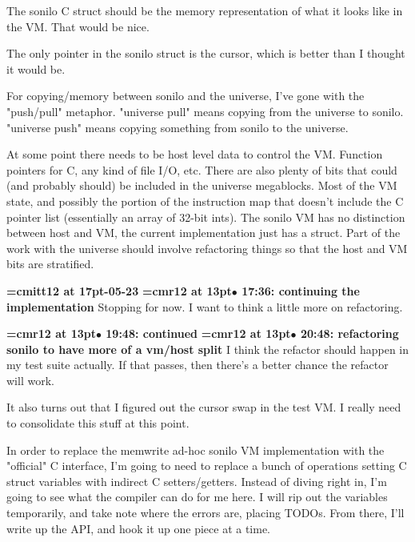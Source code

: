 The sonilo C struct should be the memory representation of what it looks like in the VM. That would be nice.
\par

The only pointer in the sonilo struct is the cursor, which is better than I thought it would be.
\par

For copying/memory between sonilo and the universe, I've gone with the "push/pull" metaphor. "universe pull" means copying from the universe to sonilo. "universe push" means copying something from sonilo to the universe.
\par

At some point there needs to be host level data to control the VM. Function pointers for C, any kind of file I/O, etc. There are also plenty of bits that could (and probably should) be included in the universe megablocks. Most of the VM state, and possibly the portion of the instruction map that doesn't include the C pointer list (essentially an array of 32-bit ints). The sonilo VM has no distinction between host and VM, the current implementation just has a struct. Part of the work with the universe should involve refactoring things so that the host and VM bits are stratified.
\par

{\medskip\noindent\bf\font\titlefont=cmitt12 at 17pt-05-23}\medskip
{\smallskip\noindent\bf\font\titlefont=cmr12 at 13pt\titlefont $\bullet$ 17:36: continuing the implementation}\smallskip
Stopping for now. I want to think a little more on refactoring.
\par

{\smallskip\noindent\bf\font\titlefont=cmr12 at 13pt\titlefont $\bullet$ 19:48: continued}\smallskip
{\smallskip\noindent\bf\font\titlefont=cmr12 at 13pt\titlefont $\bullet$ 20:48: refactoring sonilo to have more of a vm/host split}\smallskip
I think the refactor should happen in my test suite actually. If that passes, then there's a better chance the refactor will work.
\par

It also turns out that I figured out the cursor swap in the test VM. I really need to consolidate this stuff at this point.
\par

In order to replace the memwrite ad-hoc sonilo VM implementation with the "official" C interface, I'm going to need to replace a bunch of operations setting C struct variables with indirect C setters/getters. Instead of diving right in, I'm going to see what the compiler can do for me here. I will rip out the variables temporarily, and take note where the errors are, placing TODOs. From there, I'll write up the API, and hook it up one piece at a time.
\par


